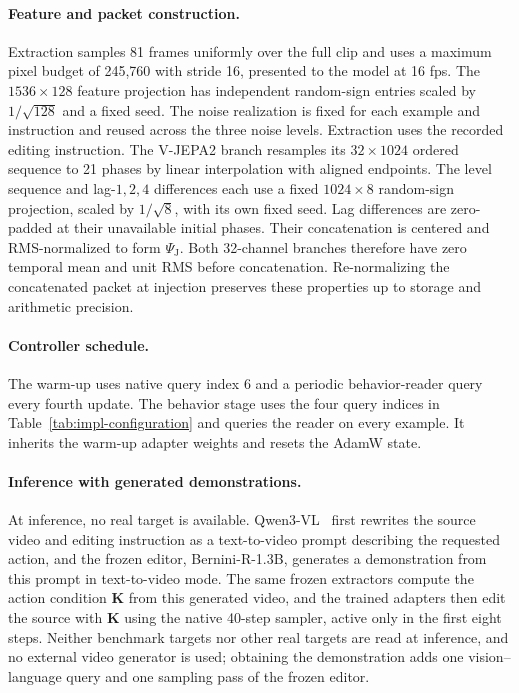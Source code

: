 \paragraph{Feature and packet construction.}
Extraction samples 81 frames uniformly over the full clip and uses a
maximum pixel budget of 245,760 with stride 16, presented to the model
at 16 fps. The $1536\!\times\!128$ feature projection has independent
random-sign entries scaled by $1/\sqrt{128}$ and a fixed seed.
The noise realization is fixed for each example and instruction and
reused across the three noise levels. Extraction uses the recorded editing instruction.
The V-JEPA2 branch resamples its $32\!\times\!1024$ ordered sequence to
21 phases by linear interpolation with aligned endpoints. The level
sequence and lag-$1,2,4$ differences each use a fixed
$1024\!\times\!8$ random-sign projection, scaled by $1/\sqrt8$, with
its own fixed seed. Lag differences are zero-padded
at their unavailable initial phases. Their concatenation is centered
and RMS-normalized to form $\Psi_{\mathrm J}$.
Both 32-channel branches therefore have zero temporal mean and unit RMS
before concatenation. Re-normalizing the concatenated packet at injection
preserves these properties up to storage and arithmetic precision.

\paragraph{Controller schedule.}
The warm-up uses native query index 6 and a periodic behavior-reader
query every fourth update. The behavior stage uses the four query indices
in Table~\ref{tab:impl-configuration} and queries the reader on every
example. It inherits the warm-up adapter weights and resets the AdamW
state.

\paragraph{Inference with generated demonstrations.}
At inference, no real target is available.
Qwen3-VL~\citep{bai2025qwen3vl} first rewrites the source video and
editing instruction as a text-to-video prompt describing the requested
action, and the frozen editor, Bernini-R-1.3B, generates a demonstration
from this prompt in text-to-video mode.
The same frozen extractors compute the action condition $\mathbf K$ from
this generated video, and the trained adapters then edit the source with
$\mathbf K$ using the native 40-step sampler, active only in the first
eight steps. Neither benchmark targets nor other real targets are read at
inference, and no external video generator is used; obtaining the demonstration
adds one vision--language query and one sampling pass of the frozen
editor.

